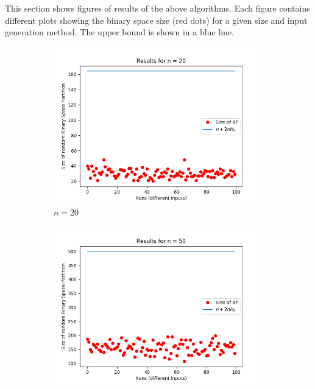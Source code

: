 \documentclass[letterpaper]{article}
\begin{document}
This section shows figures of results of the above algorithms. Each figure
contains different plots showing the binary space size (red dots) for a given
size and input generation method. The upper bound is shown in a blue line.

\begin{figure}[H]
    \begin{subfigure}{.33\textwidth}
      \centering
      \includegraphics[width=1\linewidth]{images/assign1/random/inputs_20}
      \caption{$n = 20$}
    \end{subfigure}
    \begin{subfigure}{.33\textwidth}
      \centering
      \includegraphics[width=1\linewidth]{images/assign1/random/inputs_50}

\end{subfigure}
\end{figure}
\end{document}
